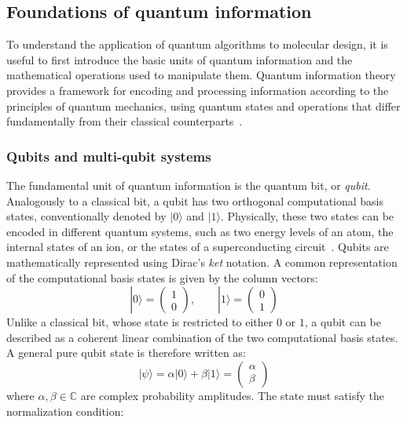 \subsection{Foundations of quantum information}
To understand the application of quantum algorithms to molecular design, it is useful to first introduce the basic units of quantum information and the mathematical operations used to manipulate them. Quantum information theory provides a framework for encoding and processing information according to the principles of quantum mechanics, using quantum states and operations that differ fundamentally from their classical counterparts~\cite{nielsen2010quantum,preskill1998quantum}.
\subsubsection{Qubits and multi-qubit systems}
The fundamental unit of quantum information is the quantum bit, or \textit{qubit}. Analogously to a classical bit, a qubit has two orthogonal computational basis states, conventionally denoted by $|0\rangle$ and $|1\rangle$. Physically, these two states can be encoded in different quantum systems, such as two energy levels of an atom, the internal states of an ion, or the states of a superconducting circuit~\cite{nielsen2010quantum,preskill1998quantum}.
Qubits are mathematically represented using Dirac's \textit{ket} notation. A common representation of the computational basis states is given by the column vectors:
\begin{equation}
|0\rangle =
\begin{pmatrix}
1\\
0
\end{pmatrix},
\qquad
|1\rangle =
\begin{pmatrix}
0\\
1
\end{pmatrix}
\end{equation}
Unlike a classical bit, whose state is restricted to either $0$ or $1$, a qubit can be described as a coherent linear combination of the two computational basis states. A general pure qubit state is therefore written as:
\begin{equation}
|\psi\rangle = \alpha|0\rangle + \beta|1\rangle =
\begin{pmatrix}
\alpha\\
\beta
\end{pmatrix}
\end{equation}
where $\alpha,\beta\in\mathbb{C}$ are complex probability amplitudes. The state must satisfy the normalization condition:
